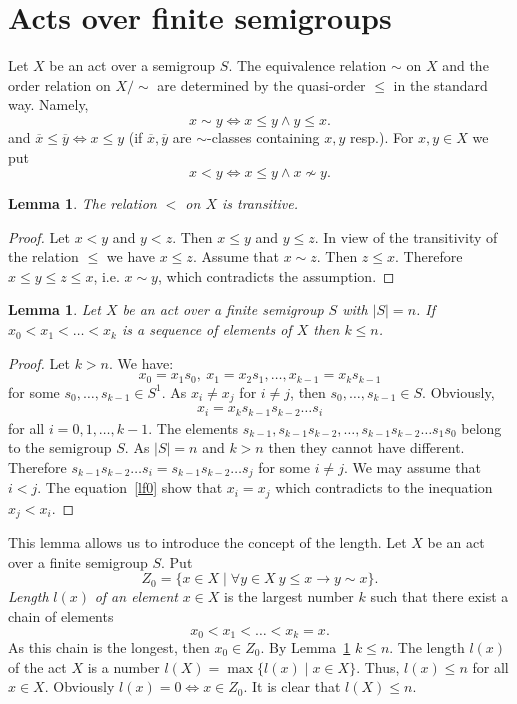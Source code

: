 \documentclass{birkau}
\numberwithin{equation}{section}
\theoremstyle{plain}
\newtheorem{lemma}[theorem]{Lemma}
\theoremstyle{definition}
\begin{document}
	\section{Acts over finite semigroups}
	
	Let $X$ be an act over a semigroup $S$. The equivalence relation $\sim$ on $X$ and the order relation on $X/\sim$ are determined by the quasi-order $\leqslant$ in the standard way. Namely, $$ x \sim y \Leftrightarrow x \leqslant y \wedge y \leqslant x. $$ and $\overline{x} \leqslant \overline{y} \Leftrightarrow x \leqslant y $ (if $\overline{x}, \overline{y}$ are $\sim$-classes containing $x,y$ resp.).
	For $x,y \in X$ we put $$ x < y \Leftrightarrow x \leqslant y \wedge x \nsim y. $$
	
	\begin{lemma} \label{lemma:03}
	    The relation $<$ on $X$ is transitive.
	\end{lemma}
	\begin{proof}
	    Let $x < y$ and $y < z$. Then $x \leqslant y$ and $y \leqslant z$. In view of the transitivity of the relation $\leqslant$ we have $x \leqslant z$. Assume that $x \sim z$. Then $z \leqslant x$. Therefore $x \leqslant y \leqslant z \leqslant x$, i.e. $x \sim y$, which contradicts the assumption.
	\end{proof}
	
	\begin{lemma} \label{lemma:04}
	    Let $X$ be an act over a finite semigroup $S$ with $|S| = n$. If $x_0 < x_1 < \ldots < x_k$ is a sequence of elements of $X$ then $k \leqslant n$.
	\end{lemma}
	\begin{proof}
	    Let $k > n$. We have: $$x_0 = x_1 s_0,\ x_1 = x_2s_1, \ldots , x_{k-1} = x_k s_{k-1}$$ for some $s_0,\ldots,s_{k-1} \in S^1$. As $x_i \neq x_j$ for $i \neq j$, then $ s_0,\ldots,s_{k-1} \in S$. Obviously,
		\begin{gather}
			x_i = x_k s_{k-1} s_{k-2} \ldots s_i \label{lf0}
		\end{gather}
		for all $i = 0,1,\ldots,k-1$. The elements $s_{k-1},s_{k-1}s_{k-2},\ldots,s_{k-1}s_{k-2}\ldots s_1s_0$ belong to the semigroup $S$. As $|S| = n$ and $k>n$ then they cannot have different. Therefore $s_{k-1}s_{k-2}\ldots s_i = s_{k-1}s_{k-2}\ldots s_j$ for some $i\neq j$. We may assume that $i < j$. The equation~\eqref{lf0} show that $x_i = x_j$ which contradicts to the inequation $x_j < x_i$.
	\end{proof}
	
	This lemma allows us to introduce the concept of the length. Let $X$ be an act over a finite semigroup $S$. Put $$ Z_0 = \{ x \in X \mid \forall y \in X \ y \leqslant x \rightarrow y \sim x \}.$$ \textit{Length} $l(x)$ \textit{of an element} $x \in X$ is the largest number $k$ such that there exist a chain of elements $$x_0 < x_1 < \ldots < x_k=x.$$ As this chain is the longest, then $x_0 \in Z_0$. By Lemma~\ref{lemma:04} $k \leqslant n$. The length $l(x)$ of the act $X$ is a number $l(X) = \max \{ l(x) \mid x \in X\}$. Thus, $l(x) \leqslant n$ for all $x \in X$. Obviously $l(x) = 0 \Leftrightarrow x \in Z_0$. It is clear that $l(X) \leqslant n$.
	
\end{document}
